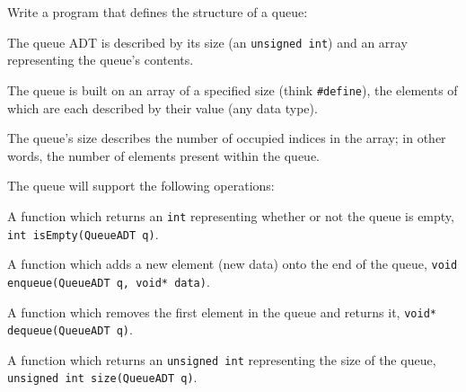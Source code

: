Write a program that defines the structure of a queue:
\begin{itemize} {\small
	\item The queue ADT is described by its size (an \texttt{unsigned int}) and an array representing the queue's contents.
	\item The queue is built on an array of a specified size (think \texttt{\#define}), the elements of which are each described by their value (any data type).
	\item The queue's size describes the number of occupied indices in the array; in other words, the number of elements present within the queue.
	\item The queue will support the following operations:}
	\begin{itemize} {\scriptsize
		\item A function which returns an \texttt{int} representing whether or not the queue is empty, \texttt{int isEmpty(QueueADT q)}.
		\item A function which adds a new element (new data) onto the end of the queue, \texttt{void enqueue(QueueADT q, void* data)}.
		\item A function which removes the first element in the queue and returns it, \texttt{void* dequeue(QueueADT q)}.
		\item A function which returns an \texttt{unsigned int} representing the size of the queue, \texttt{unsigned int size(QueueADT q)}.}
	\end{itemize}
\end{itemize}

\begin{answer}
	
\end{answer}